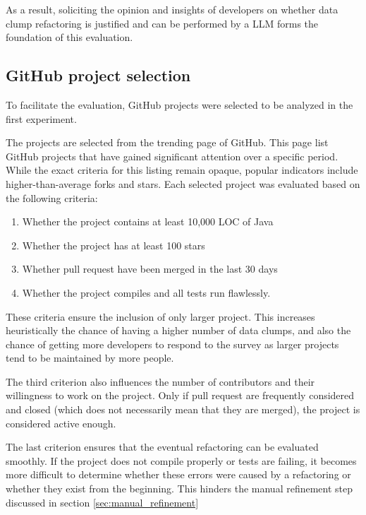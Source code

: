 As a result, soliciting  the opinion and insights of developers on whether data clump refactoring is justified and can be performed by a \ac{LLM}  forms the foundation of this evaluation.



\subsection{GitHub project selection}\label{sec:github_projects}

To facilitate the evaluation, GitHub projects were selected to be analyzed in the first experiment. 


The projects are selected from the trending page of GitHub. This page list GitHub projects that have gained significant attention over a specific  period. While the exact criteria for this listing remain opaque, popular indicators include higher-than-average forks and stars. Each selected project was evaluated based on the following criteria:
\begin{enumerate}
    \item Whether the project contains at least  10,000 \ac{LOC} of Java
        \item Whether the project  has at least 100 stars
\item Whether pull request have been merged in the last 30 days
\item Whether the project compiles and all tests run flawlessly.
\end{enumerate}

These criteria ensure the inclusion of  only larger project. This increases heuristically the chance of having a higher number of data clumps, and also the chance of getting more developers to respond to the survey as larger projects tend to be maintained by more people. 

The third criterion also influences the number of contributors and their willingness to work on the project. Only if pull request are frequently considered and closed (which does not necessarily mean that they are merged), the project is considered active enough. 

The last criterion ensures that the eventual refactoring can be evaluated smoothly. If the project does not compile properly or tests are failing, it becomes more difficult to determine whether these errors were caused by a refactoring or whether they exist from the beginning. This hinders the manual refinement step discussed in section \ref{sec:manual_refinement}

